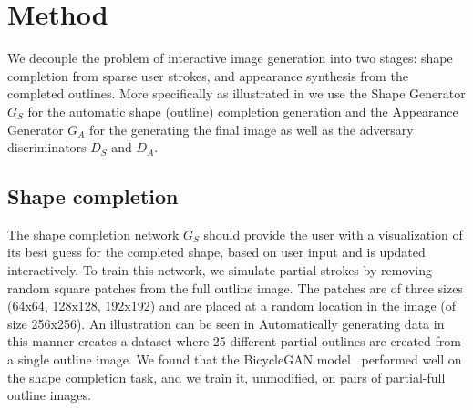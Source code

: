 \section{Method}
We decouple the problem of interactive image generation into two stages: shape completion from sparse user strokes, and appearance synthesis from the completed outlines. More specifically as illustrated in  we use the Shape Generator $G_S$ for the automatic shape (outline) completion generation and the Appearance Generator $G_A$ for the generating the final image as well as the adversary discriminators $D_S$ and $D_A$. %


\subsection{Shape completion}
\label{sec:shape}
The shape completion network $G_S$ should provide the user with a visualization of its best guess for the completed shape, based on user input and is updated interactively. 
To train this network, we simulate partial strokes by removing random square patches from the full outline image. 
The patches are of three sizes (64x64, 128x128, 192x192) and are placed at a random location in the image (of size 256x256). An illustration can be seen in 
Automatically generating data in this manner creates a dataset where 25 different partial outlines are created from a single outline image.
We found that the BicycleGAN model~\cite{zhu2017toward} performed well on the shape completion task, and we train it, unmodified, on pairs of partial-full outline images. %

